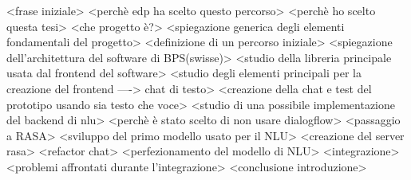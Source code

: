 <frase iniziale> 
<perchè edp ha scelto questo percorso>
<perchè ho scelto questa tesi>
<che progetto è?>
<spiegazione generica degli elementi fondamentali del progetto>
<definizione di un percorso iniziale>
<spiegazione dell'architettura del software di BPS(swisse)>
<studio della libreria principale usata dal frontend del software>
<studio degli elementi principali per la creazione del frontend ----> chat di testo>
<creazione della chat e test del prototipo usando sia testo che voce>
<studio di una possibile implementazione del backend di nlu>
<perchè è stato scelto di non usare dialogflow>
<passaggio a RASA>
<sviluppo del primo modello usato per il NLU>
<creazione del server rasa>
<refactor chat>
<perfezionamento del modello di NLU>
<integrazione>
<problemi affrontati durante l'integrazione>
<conclusione introduzione>






